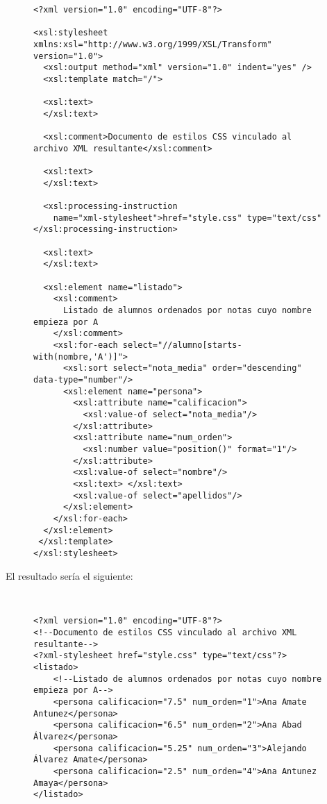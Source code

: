 \begin{itemize}
    \begin{figure}[H]
        \begin{tcolorbox}[sharp corners, colback=yellow!30, colframe=white!20]
            \scriptsize
\begin{verbatim}
<?xml version="1.0" encoding="UTF-8"?>

<xsl:stylesheet xmlns:xsl="http://www.w3.org/1999/XSL/Transform" version="1.0">
  <xsl:output method="xml" version="1.0" indent="yes" />
  <xsl:template match="/">

  <xsl:text>
  </xsl:text>

  <xsl:comment>Documento de estilos CSS vinculado al archivo XML resultante</xsl:comment>

  <xsl:text>
  </xsl:text>

  <xsl:processing-instruction
    name="xml-stylesheet">href="style.css" type="text/css"</xsl:processing-instruction>

  <xsl:text>
  </xsl:text>

  <xsl:element name="listado">
    <xsl:comment>
      Listado de alumnos ordenados por notas cuyo nombre empieza por A
    </xsl:comment>
    <xsl:for-each select="//alumno[starts-with(nombre,'A')]">
      <xsl:sort select="nota_media" order="descending" data-type="number"/>
      <xsl:element name="persona">
        <xsl:attribute name="calificacion">
          <xsl:value-of select="nota_media"/>
        </xsl:attribute>
        <xsl:attribute name="num_orden">
          <xsl:number value="position()" format="1"/>
        </xsl:attribute>
        <xsl:value-of select="nombre"/>
        <xsl:text> </xsl:text>
        <xsl:value-of select="apellidos"/>
      </xsl:element>
    </xsl:for-each>
  </xsl:element>
 </xsl:template>
</xsl:stylesheet>
\end{verbatim}
        \end{tcolorbox}
    \end{figure}

    El resultado sería el siguiente:

    \begin{figure}[H]
        \begin{tcolorbox}[sharp corners, colback=yellow!30, colframe=white!20]
            \scriptsize
\begin{verbatim}


<?xml version="1.0" encoding="UTF-8"?>
<!--Documento de estilos CSS vinculado al archivo XML resultante-->
<?xml-stylesheet href="style.css" type="text/css"?>
<listado>
    <!--Listado de alumnos ordenados por notas cuyo nombre empieza por A-->
    <persona calificacion="7.5" num_orden="1">Ana Amate Antunez</persona>
    <persona calificacion="6.5" num_orden="2">Ana Abad Álvarez</persona>
    <persona calificacion="5.25" num_orden="3">Alejando Álvarez Amate</persona>
    <persona calificacion="2.5" num_orden="4">Ana Antunez Amaya</persona>
</listado>
\end{verbatim}
        \end{tcolorbox}
    \end{figure}
\end{itemize}

